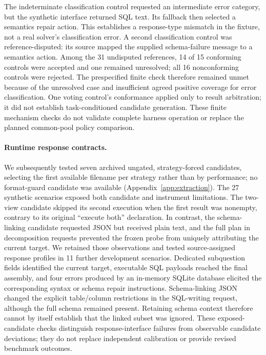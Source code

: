 The indeterminate classification control requested an intermediate error
category, but the synthetic interface returned SQL text. Its fallback then
selected a semantics repair action. This establishes a response-type mismatch
in the fixture, not a real solver's classification error. A second classification
control was reference-disputed: its source mapped the supplied schema-failure
message to a semantics action. Among the 31 undisputed references, 14 of 15
conforming controls were accepted and one remained unresolved; all 16
nonconforming controls were rejected. The prespecified finite check therefore
remained unmet because of the unresolved case and insufficient agreed positive
coverage for error classification. One voting control's conformance applied
only to result arbitration; it did not establish task-conditioned candidate
generation. These finite mechanism checks do not validate complete harness
operation or replace the planned common-pool policy comparison.

\paragraph{Runtime response contracts.}
We subsequently tested seven archived ungated, strategy-forced candidates,
selecting the first available filename per strategy rather than by performance;
no format-guard candidate was available (Appendix~\ref{app:extraction}).
The 27 synthetic scenarios exposed both candidate and instrument limitations.
The two-view candidate skipped its second execution when the first result was
nonempty, contrary to its original ``execute both'' declaration. In contrast,
the schema-linking candidate requested JSON but received plain text, and
the full plan in decomposition requests prevented the frozen probe from
uniquely attributing the current target.
We retained those observations and tested source-assigned response profiles
in 11 further development scenarios. Dedicated subquestion fields identified
the current target, executable SQL payloads reached the final assembly, and
four errors produced by an in-memory SQLite database elicited the corresponding
syntax or schema repair instructions. Schema-linking JSON changed the explicit
table/column restrictions in the SQL-writing request, although the full schema
remained present. Retaining schema context therefore cannot by itself establish
that the linked subset was ignored. These exposed-candidate checks distinguish
response-interface failures from observable candidate deviations; they do not
replace independent calibration or provide revised benchmark outcomes.
